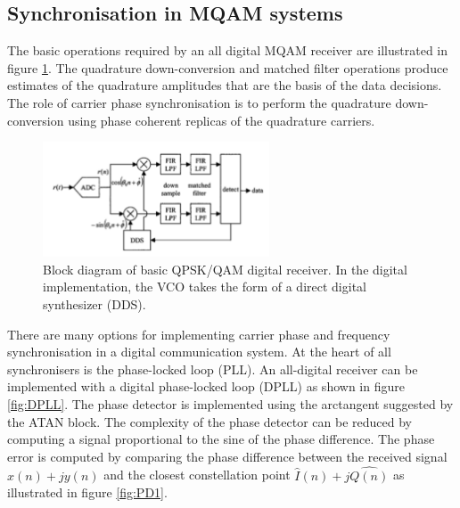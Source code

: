 \documentclass[12pt,a4paper,openright]{report}
\begin{document}
\subsection{Synchronisation in MQAM systems}
\label{subsec:MQAMsynch}
The basic operations required by an all digital MQAM receiver are illustrated in figure \ref{fig:rxMQAM}. The quadrature down-conversion and matched filter operations produce estimates of the quadrature amplitudes that are the basis of the data decisions. The role of carrier phase synchronisation is to perform the quadrature down-conversion using phase coherent replicas of the quadrature carriers.

 \begin{figure}[H]
  \centering
    \includegraphics[width=0.6\textwidth]{rxMQAM.pdf}
    \caption[Block diagram of basic QPSK/QAM digital receiver]{Block diagram of basic QPSK/QAM digital receiver. In the digital implementation, the VCO takes the form of a direct digital synthesizer (DDS). }
    \label{fig:rxMQAM}
\end{figure}

There are many options for implementing carrier phase and frequency synchronisation in a digital communication system. At the heart of all synchronisers is the phase-locked loop (PLL). An all-digital receiver can be implemented with a digital phase-locked loop (DPLL) as shown in figure \ref{fig:DPLL}. The phase detector is implemented using the arctangent suggested by the ATAN block. The complexity of the phase detector can be reduced by computing a signal proportional to the sine of the phase difference. The phase error is computed by comparing the phase difference between the received signal $x(n) + jy(n)$ and the closest constellation point $\hat{I}(n) + j\hat{Q(n)}$ as illustrated in figure \ref{fig:PD1}.
\end{document}

